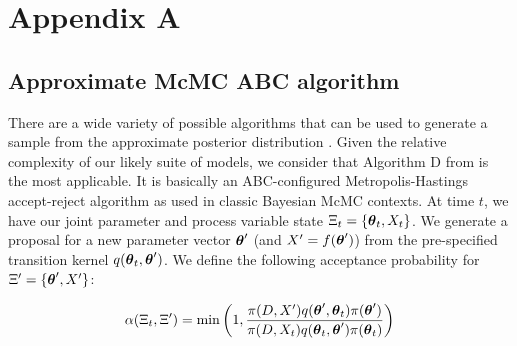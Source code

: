 \documentclass[12pt,a4paper,twoside,times,sky,standard]{csiroreport2017}
\newcommand{\ds}{\displaystyle}
\newcommand{\xtheta}{\mbox{\boldmath$\theta$}}
\begin{document}
\clearpage
\section*{Appendix A}

\subsection*{Approximate McMC ABC algorithm}

There are a wide variety of possible algorithms that can be used to generate a sample from the approximate posterior distribution \cite{abc,synlkhd,abcmcmc}. Given the relative complexity of our likely suite of models, we consider that Algorithm D from \cite{abcmcmc} is the most applicable. It is basically an ABC-configured Metropolis-Hastings accept-reject algorithm as used in classic Bayesian McMC contexts. At time $t$, we have our joint parameter and process variable state $\Xi_t=\{\xtheta_t,X_t\}$. We generate a proposal for a new parameter vector $\xtheta^\prime$ (and $X^\prime=f(\xtheta^\prime)$) from the pre-specified transition kernel $q(\xtheta_t,\xtheta^\prime)$. We define the following acceptance probability for $\Xi^\prime=\{\xtheta^\prime,X^\prime\}$:

\begin{equation*}
    \ds \alpha(\Xi_t,\Xi^\prime)=\min\left(1,\frac{\pi(D,X^\prime)q(\xtheta^\prime,\xtheta_t)\pi(\xtheta^\prime)}{\pi(D,X_t)q(\xtheta_t,\xtheta^\prime)\pi(\xtheta_t)}\right)
\end{equation*}
\end{document}
